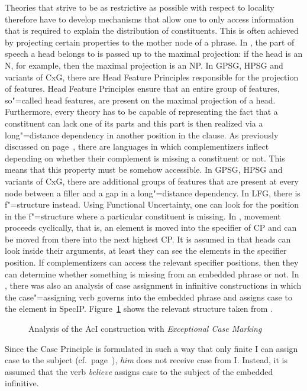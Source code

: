 Theories that strive to be as restrictive as possible with respect to locality therefore have to develop mechanisms that allow one to only
access information that is required to explain the distribution of constituents.
This is often achieved by projecting certain properties to the mother node of a phrase. In \xbart, the part of speech a head belongs to is
passed up to the maximal projection: if the head is an N, for example, then the maximal projection is an NP. In GPSG, HPSG and variants
of CxG, there are Head Feature Principles responsible for the projection of features. Head Feature Principles ensure that an entire group of
features, so"=called head features, are present on the maximal projection of a head.
Furthermore, every theory has to be capable of representing the fact that a constituent can lack one of its parts and this part is then realized via a long"=distance
dependency in another position in the clause.
As previously discussed on page~\pageref{page-Irish-complementizers}, there are languages in which complementizers inflect depending on whether their
complement is missing a constituent or not. This means that this property must be somehow accessible. In GPSG, HPSG and variants of CxG, there are additional
groups of features that are present at every node between a filler and a gap in a long"=distance dependency.
In LFG, there is f"=structure instead. Using Functional Uncertainty, one can look for the position in the f"=structure where a particular
constituent is missing. In \gbt, movement proceeds cyclically, that is, an element is moved into the specifier of CP and can
be moved from there into the next highest CP. It is assumed in \gbt that heads can look inside their arguments, at least they can see the elements in the
specifier position. If complementizers can access the relevant specifier positions, then they can
determine whether something is missing from an embedded phrase or not. In \gbt, there was also an analysis of case
assignment in infinitive constructions in which the case"=assigning verb governs into the embedded
phrase and assigns case to the element in \mbox{SpecIP}. Figure~\ref{Abbildung-ECM} shows the
relevant structure taken from .
\begin{figure}
\centering
{}
\caption{\label{Abbildung-ECM}Analysis of the AcI construction with \emph{Exceptional Case Marking}}
\end{figure}%
Since the Case Principle is formulated in such a way that only finite I can assign case to the subject
(cf.\ page~\pageref{Kasusprinzip-GB}), \emph{him} does not receive case from I. Instead, it is assumed that
the verb \emph{believe} assigns case to the subject of the embedded infinitive.

